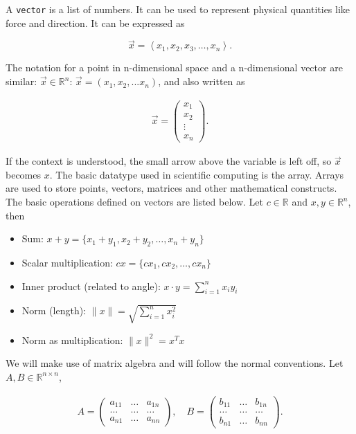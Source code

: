 A \texttt{vector} is a list of numbers. It can be used to represent
physical quantities like force and direction. It can be expressed as

\[\vec{x} = \left< x_1, x_2, x_3, \dots , x_n \right>.\]

The notation for a point in n-dimensional space and a n-dimensional
vector are similar: \(\vec{x}\in \mathbb{R}^n\):
\(\vec{x} = (x_1, x_2, ... x_n)\), and also written as

\[\begin{aligned}
\vec{x} = \left(\begin{array}{c} x_1 \\ x_2 \\ \vdots
\\ x_n \end{array}\right).
\end{aligned}\]

If the context is understood, the small arrow above the variable is left
off, so \(\vec{x}\) becomes \(x\). The basic datatype used in scientific
computing is the array. Arrays are used to store points, vectors,
matrices and other mathematical constructs. The basic operations defined
on vectors are listed below. Let \(c\in \mathbb{R}\) and \(x,y \in
\mathbb{R}^n\), then

\begin{itemize}
\tightlist
\item
  Sum: \(x+y = \{ x_1 + y_1, x_2 + y_2, \dots, x_n + y_n\}\)
\item
  Scalar multiplication: \(cx = \{ cx_1, cx_2, \dots , cx_n\}\)
\item
  Inner product (related to angle): \(x \cdot y = \sum_{i=1}^n x_iy_i\)
\item
  Norm (length): \(\| x \| = \sqrt{\sum_{i=1}^n x_i^2}\)
\item
  Norm as multiplication: \(\| x \|^2 = x^T x\)
\end{itemize}

We will make use of matrix algebra and will follow the normal
conventions. Let \(A, B \in \mathbb{R}^{n\times n}\),

\[\begin{aligned}
A =
\left( \begin{array}{ccc}a_{11}&\dots&a_{1n}\\ \dots & \dots & \dots
\\ a_{n1} & \dots & a_{nn}\end{array}\right), \quad B =
\left( \begin{array}{ccc}b_{11}&\dots&b_{1n}\\ \dots & \dots & \dots
\\ b_{n1} & \dots & b_{nn}\end{array}\right).
\end{aligned}\]

